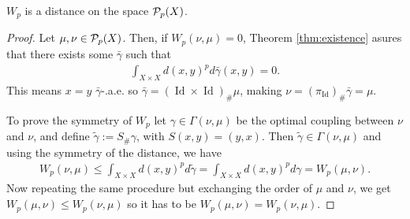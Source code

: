 \begin{proposition}
    $W_p$ is a distance on the space $ \mathcal P_p(X) $.
\end{proposition}

\begin{proof}
    Let $ \mu, \nu \in \mathcal P_p(X) $. Then, if $W_p(\nu, \mu) = 0 $, Theorem \ref{thm:existence} asures that there exists some $ \bar \gamma $ such that
    \begin{align*}
        \int_{X \times X} d(x, y)^p d{\bar \gamma}(x, y) = 0.
    \end{align*}
    This means $ x = y $ $\bar \gamma$-.a.e. so $ \bar \gamma = (\operatorname{Id} \times \operatorname{Id})_\# \mu $, making $ \nu = (\pi_{\operatorname{Id}})_\# \bar \gamma = \mu $.

    To prove the symmetry of $ W_p $ let $ \gamma \in \Gamma(\nu, \mu) $ be the optimal coupling between $ \nu $ and $ \nu $, and define $ \tilde \gamma := S_\# \gamma $, with $ S(x, y) = (y, x) $. Then $ \tilde \gamma \in \Gamma(\nu, \mu) $ and using the symmetry of the distance, we have
    \begin{align*}
        W_p(\nu, \mu) \leq \int_{X \times X} d(x, y)^p d \tilde \gamma = \int_{X \times X} d(x, y)^p d \gamma = W_p(\mu, \nu).
    \end{align*}
    Now repeating the same procedure but exchanging the order of $ \mu $ and $ \nu $, we get $  W_p(\mu, \nu) \leq W_p(\nu, \mu)$ so it has to be $  W_p(\mu, \nu )= W_p(\nu, \mu)$.


\end{proof}
